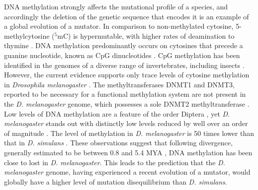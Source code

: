 DNA methylation strongly affects the mutational profile of a species, and accordingly the deletion of the genetic sequence that encodes it is an example of a global evolution of a mutator. In comparison to non-methylated cytosine, 5-methylcytosine ($^5$mC) is hypermutable, with higher rates of deamination to thymine \citep{Coulondre1978MolecularColi}. DNA methylation predominantly occurs on cytosines that precede a guanine nucleotide, known as CpG dinucleotides \citep{Holliday1975DNADevelopment}. CpG methylation has been identified in the genomes of a diverse range of invertebrates, including insects \citep{Wang2010EstimatingLoci}. However, the current evidence supports only trace levels of cytosine methylation in \textit{Drosophila melanogaster} \citep{Capuano2014CytosineSpecies, Deshmukh2018LevelsGenome}. The methyltransferases DNMT1 and DNMT3, reported to be necessary for a functional methylation system are not present in the \textit{D. melanogaster} genome, which possesses a sole DNMT2 methyltransferase \citep{Goll2005EukaryoticMethyltransferases, Tweedie1999VestigesMelanogaster}. Low levels of DNA methylation are a feature of the order Diptera \citep{Bewick2017EvolutionInsects, Provataris2018SignaturesHolometabola}, yet \textit{D. melanogaster} stands out with distinctly low levels reduced by well over an order of magnitude \citep{Deshmukh2018LevelsGenome}. The level of methylation in \textit{D. melanogaster} is 50 times lower than that in \textit{D. simulans} \citep{Deshmukh2018LevelsGenome}. These observations suggest that following divergence, generally estimated to be between 0.8 and 5.4 MYA \citep{Cutter2008DivergenceRate, Wang2010EstimatingLoci, Tamura2004TemporalClocks}, DNA methylation has been close to lost in \textit{D. melanogaster}. This leads to the prediction that the \textit{D. melanogaster} genome, having experienced a recent evolution of a mutator, would globally have a higher level of mutation disequilibrium than \textit{D. simulans}. 


